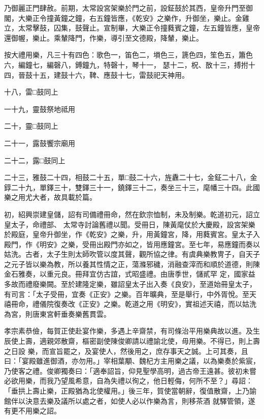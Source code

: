 \begin{pinyinscope}
 乃御麗正門肆赦。前期，太常設宮架樂於門之前，設鉦鼓於其西，皇帝升門至御閣，大樂正令撞黃鐘之鐘，右五鐘皆應，《乾安》之樂作，升御坐，樂止。金雞立，太常擊鼓，囚集，鼓聲止。宣制畢，大樂正令撞蕤賓之鐘，左五鐘皆應，皇帝還御幄，樂止。乘輦降門，作樂，導引至文德殿，降輦，樂止。



 按大禮用樂，凡三十有四色：歌色一，笛色二，塤色三，篪色四，笙色五，簫色六，編鐘七，編磬八，鎛鐘九，特磬十，琴十一，
 瑟十二，柷、敔十三，搏拊十四，晉鼓十五，建鼓十六，鞞、應鼓十七，雷鼓祀天神用。



 十八，雷□鼓同上



 一十九，靈鼓祭地祗用



 二十，靈□鼓同上



 二十一，露鼓饗宗廟用



 二十二，露□鼓同上



 二十三，雅鼓二十四，相鼓二十五，單□鼓二十六，旌纛二十七，金鉦二十八，金錞二十九，單鐸三十，雙鐸三十一，鐃鐸三十二，奏坐三十三，麾幡三十四。此國樂之用尤大者，故具載於篇。



 初，紹興崇建皇儲，詔有司備禮冊命，然在欽宗恤制，未及制樂。乾道初元，詔立皇太子，命禮部、
 太常寺討論舊禮以聞。受冊日，陳黃麾仗於大慶殿，設宮架樂於殿庭，皇帝升御坐，作《乾安》之樂，升，用黃鐘宮，降，用蕤賓宮。皇太子入殿門，作《明安》之樂，受冊出殿門亦如之，皆用應鐘宮。至七年，易應鐘而奏以姑洗。古者，太子生則太師吹管以度其聲，觀所協之律。有虞典樂教冑子，自天子之元子皆以樂為教，所以養其性情之正，蕩滌邪穢，消融查滓而和順於道德，則陳金石雅奏，以重元良。冊拜宜仿古誼，式昭盛禮。由唐季世，儲貳罕
 定，國家益多故而禮廢樂闕。至於建隆定樂，雖詔皇太子出入奏《良安》，至道始冊皇太子，有司言：「太子受冊，宜奏《正安》之樂。百年曠典，至是舉行，中外胥悅。至天禧冊命，禮儀院復奏改《正安》之樂。乾道之用《明安》，實祖述天禧，而以姑洗為宮，則唐東宮軒垂奏樂舊貫雲。



 孝宗素恭儉，每賀正使赴宴作樂，多遇上辛齋禁，有司條治平用樂典故以進。及生辰使上壽，適親郊散齋，樞密副使陳俊卿請以禮諭北使，毋用樂。不得已，則上壽之日設
 樂，而宣旨罷之，及宴使人，然後用之，庶存事天之誠。上可其奏，且曰：「宴殿雖進御酒，亦勿用。」宰相葉顒、魏杞方主用樂之議，以為樂奏於紫宸，乃使客之禮。俊卿獨奏曰：「適奉詔旨，仰見聖學高明，過古帝王遠甚。彼初未嘗必欲用樂，而我乃望風希意，自為失禮以徇之，他日輕侮，何所不至？」尋詔：「垂拱上壽止樂，正殿猶為北使權用。」後三年，賀使當朝辭，復值散齋，上乃諭館伴以決意去樂及議所以處之者，如使人必以作樂為言，則移茶酒
 就驛管領，遂有更不用樂之詔。




\end{pinyinscope}
